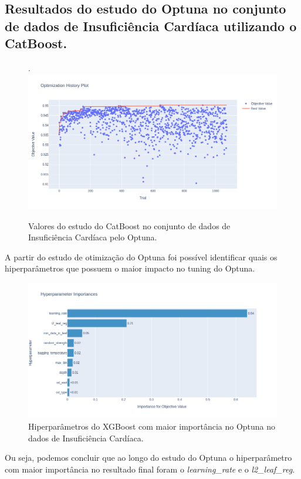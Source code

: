 \subsection{Resultados do estudo do Optuna no conjunto de dados de Insuficiência Cardíaca utilizando o CatBoost.}
\begin{figure}[H]
 \caption{Valores do estudo do CatBoost no conjunto de dados de Insuficiência Cardíaca pelo Optuna.}.
 \label{fig:op:heart:trials:cat}
 \centering
 \includegraphics[scale=0.4]{images/optuna_catboost_heart.png}
\end{figure}
A partir do estudo de otimização do Optuna foi possível identificar quais os hiperparâmetros que possuem o maior impacto no tuning do Optuna.
\begin{figure}[H]
 \caption{Hiperparâmetros do XGBoost com maior importância no Optuna no dados de Insuficiência Cardíaca.}
 \label{fig:op:heart:impo:cat}
 \centering
 \includegraphics[scale=0.4]{images/optuna_catboost_importance_heart.png}
\end{figure}
Ou seja, podemos concluir que ao longo do estudo do Optuna o hiperparâmetro com maior importância no resultado final foram o \textit{learning\_rate} e o \textit{l2\_leaf\_reg}.

